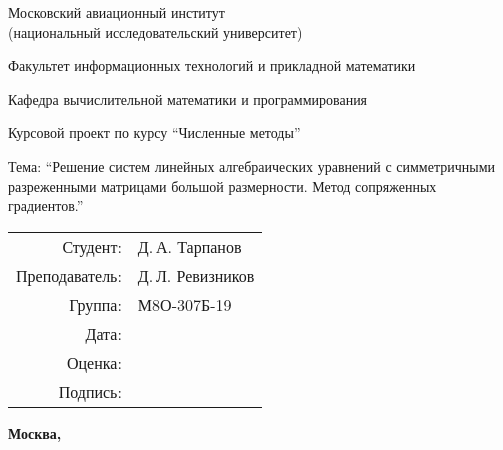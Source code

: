 \begin{titlepage}
\begin{center}
\bfseries

{\Large Московский авиационный институт \\ (национальный исследовательский университет)

}

\vspace{48pt}

{\large Факультет информационных технологий и прикладной математики
}

\vspace{36pt}

{\large Кафедра вычислительной математики и программирования

}

\vspace{48pt}

Курсовой проект по курсу \enquote{Численные методы}

Тема: \enquote{Решение систем линейных алгебраических уравнений с симметричными
разреженными матрицами большой размерности. Метод сопряженных градиентов.}

\end{center}

\vspace{72pt}

\begin{flushright}
\begin{tabular}{rl}
Студент: & Д.\,А. Тарпанов \\
Преподаватель: & Д.\,Л. Ревизников \\
Группа: & М8О-307Б-19 \\
Дата: & \\
Оценка: & \\
Подпись: & \\
\end{tabular}
\end{flushright}

\vfill

\begin{center}
\bfseries
Москва, \the\year
\end{center}
\end{titlepage}

\pagebreak
